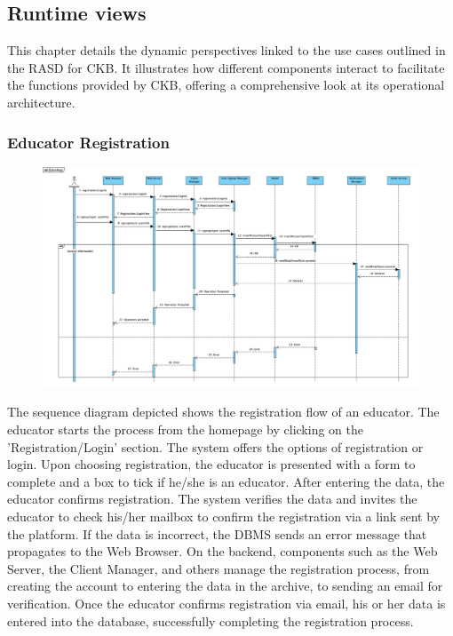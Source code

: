 \subsection{Runtime views}
This chapter details the dynamic perspectives linked to the use cases outlined in the RASD for CKB. It illustrates how different components interact to facilitate the functions provided by CKB, offering a comprehensive look at its operational architecture.
\subsubsection{Educator Registration}
\begin{figure}[H]
    \centering
    \includegraphics[width=1\textwidth]{SequenceDiagram/EducatorReg.png}
    \label{fig:enter-label}
\end{figure}

The sequence diagram depicted shows the registration flow of an educator. The educator starts the process from the homepage by clicking on the 'Registration/Login' section. The system offers the options of registration or login. Upon choosing registration, the educator is presented with a form to complete and a box to tick if he/she is an educator. After entering the data, the educator confirms registration. The system verifies the data and invites the educator to check his/her mailbox to confirm the registration via a link sent by the platform. If the data is incorrect, the DBMS sends an error message that propagates to the Web Browser. On the backend, components such as the Web Server, the Client Manager, and others manage the registration process, from creating the account to entering the data in the archive, to sending an email for verification. Once the educator confirms registration via email, his or her data is entered into the database, successfully completing the registration process.


